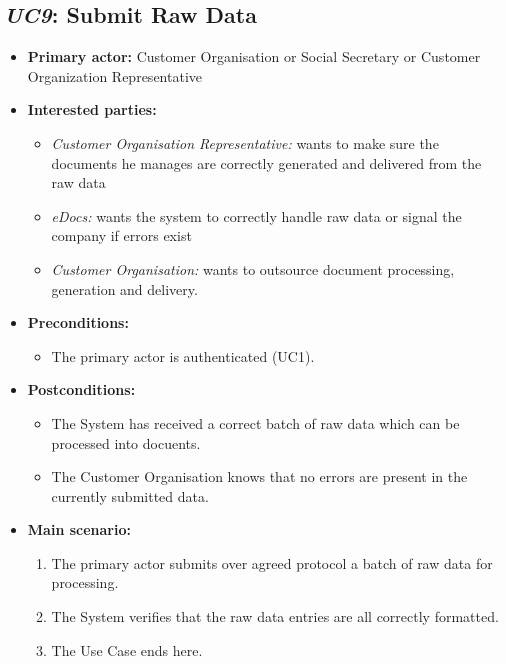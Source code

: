 \documentclass[a4paper,10pt]{article}
\begin{document}
\subsection{\emph{UC9}: Submit Raw Data}
\begin{itemize}
    \item \textbf{Primary actor:} Customer Organisation or Social Secretary or Customer Organization Representative
    \item \textbf{Interested parties:} 
        \begin{itemize}
            \item \textit{Customer Organisation Representative:} wants to make sure the documents he manages are correctly generated and delivered from the raw data
            \item \textit{eDocs:} wants the system to correctly handle raw data or signal the company if errors exist
            \item \textit{Customer Organisation:} wants to outsource document processing, generation and delivery.
        \end{itemize}

    \item \textbf{Preconditions:}
        \begin{itemize}
            \item The primary actor is authenticated (UC1).
        \end{itemize}

    \item \textbf{Postconditions:}
        \begin{itemize}
            \item The System has received a correct batch of raw data which can be processed into docuents.
            \item The Customer Organisation knows that no errors are present in the currently submitted data.
        \end{itemize}
        
    \item \textbf{Main scenario:} 
    \begin{enumerate}
       \item The primary actor submits over agreed protocol a batch of raw data for processing.
       \item The System verifies that the raw data entries are all correctly formatted.
       \item The Use Case ends here.
    \end{enumerate}


\end{itemize}
\end{document}
